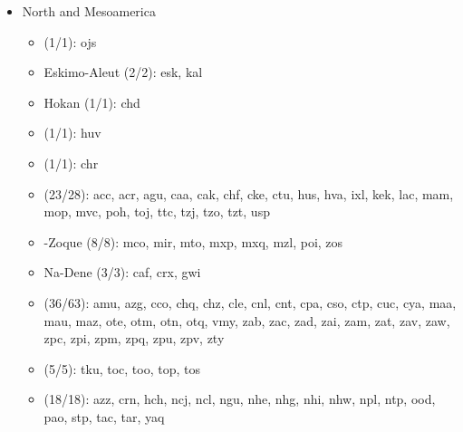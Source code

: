 \begin{itemize}[label={},leftmargin=0cm,labelindent=5pt,itemindent=0pt]
  \item North and Mesoamerica
    \begin{itemize}[label={},leftmargin=!,labelindent=5pt,itemindent=-15pt]
  	\item {} (1/1): ojs
  	\item Eskimo-Aleut (2/2): esk, kal
  	\item Hokan (1/1): chd
  	\item {} (1/1): huv
  	\item {} (1/1): chr
  	\item {} (23/28): acc, acr, agu, caa, cak, chf, cke, ctu, hus, hva, ixl, kek, lac, mam, mop, mvc, poh, toj, ttc, tzj, tzo, tzt, usp
  	\item {}-Zoque (8/8): mco, mir, mto, mxp, mxq, mzl, poi, zos
  	\item Na-Dene (3/3): caf, crx, gwi
  	\item {} (36/63): amu, azg, cco, chq, chz, cle, cnl, cnt, cpa, cso, ctp, cuc, cya, maa, mau, maz, ote, otm, otn, otq, vmy, zab, zac, zad, zai, zam, zat, zav, zaw, zpc, zpi, zpm, zpq, zpu, zpv, zty
  	\item {} (5/5): tku, toc, too, top, tos
  	\item {} (18/18): azz, crn, hch, ncj, ncl, ngu, nhe, nhg, nhi, nhw, npl, ntp, ood, pao, stp, tac, tar, yaq
    \end{itemize}


\end{itemize}
